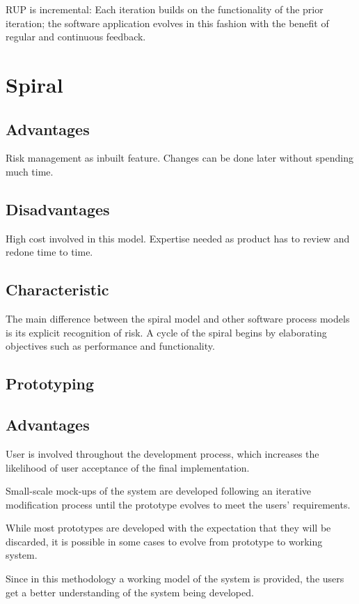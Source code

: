 RUP is incremental: Each iteration builds on the functionality of the prior iteration; the software application evolves in this fashion with the benefit of regular and continuous feedback.

\section*{Spiral}

\subsection*{Advantages}
Risk management as inbuilt feature.
Changes can be done later without spending much time.

\subsection*{Disadvantages}
High cost involved in this model.
Expertise needed as product has to review and redone time to time.

\subsection*{Characteristic}
The main difference between the spiral model and other software process models is
its explicit recognition of risk. A cycle of the spiral begins by elaborating objectives
such as performance and functionality.

\subsection*{Prototyping}

\subsection*{Advantages}
User is involved throughout the development process, which increases the likelihood of user acceptance of the final implementation.

Small-scale mock-ups of the system are developed following an iterative modification process until the prototype evolves to meet the users’ requirements.

While most prototypes are developed with the expectation that they will be discarded, it is possible in some cases to evolve from prototype to working system.

Since in this methodology a working model of the system is provided, the users get a better understanding of the system being developed.

